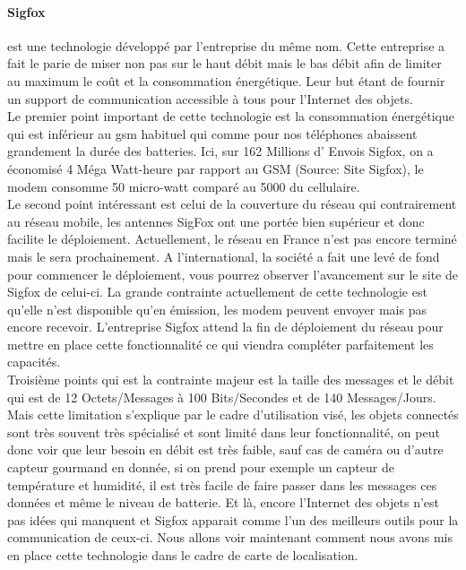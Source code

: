 \documentclass[10pt,a4paper]{article}
\begin{document}
\paragraph{Sigfox}
est une technologie développé par l'entreprise du même nom. Cette entreprise a fait le parie de miser non pas sur le haut débit mais le bas débit afin de limiter au maximum le coût et la consommation énergétique. Leur but étant de fournir un support de communication accessible à tous pour l'Internet des objets.\\ Le premier point important de cette technologie est la consommation énergétique qui est inférieur au gsm habituel qui comme pour nos téléphones abaissent grandement la durée des batteries. Ici, sur 162 Millions d' Envois Sigfox, on a économisé 4 Méga Watt-heure par rapport au GSM (Source: Site Sigfox), le modem consomme 50 micro-watt comparé au 5000 du cellulaire. \\Le second point intéressant est celui de la couverture du réseau qui contrairement au réseau mobile, les antennes SigFox ont une portée bien supérieur et donc facilite le déploiement. Actuellement, le réseau en France n'est pas encore terminé mais le sera prochainement. A l'international, la société a fait une levé de fond pour commencer le déploiement, vous pourrez observer l'avancement sur le site de Sigfox de celui-ci. La grande contrainte actuellement de cette technologie est qu'elle n'est disponible qu'en émission, les modem peuvent envoyer mais pas encore recevoir. L'entreprise Sigfox attend la fin de déploiement du réseau pour mettre en place cette fonctionnalité ce qui viendra compléter parfaitement les capacités.\\Troisième points qui est la contrainte majeur est la taille des messages et le débit qui est de 12 Octets/Messages à 100 Bits/Secondes et de 140 Messages/Jours. Mais cette limitation s'explique par le cadre d'utilisation visé, les objets connectés sont très souvent très spécialisé et sont limité dans leur fonctionnalité, on peut donc voir que leur besoin en débit est très faible, sauf cas de caméra ou d'autre capteur gourmand en donnée, si on prend pour exemple un capteur de température et humidité, il est très facile de faire passer dans les messages ces données et même le niveau de batterie. Et là, encore l'Internet des objets n'est pas idées qui manquent et Sigfox apparait comme l'un des meilleurs outils pour la communication de ceux-ci. Nous allons voir maintenant comment nous avons mis en place cette technologie dans le cadre de carte de localisation.
\end{document}
